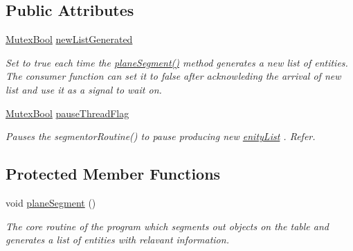 \subsection*{Public Attributes}
\begin{DoxyCompactItemize}
\item 
\hypertarget{classpersonal_robotics_1_1_object_segmentor_a11ae4522730ff37ab707dbacaf9c09fa}{}\hyperlink{classpersonal_robotics_1_1_mutex_type}{Mutex\+Bool} \hyperlink{classpersonal_robotics_1_1_object_segmentor_a11ae4522730ff37ab707dbacaf9c09fa}{new\+List\+Generated}\label{classpersonal_robotics_1_1_object_segmentor_a11ae4522730ff37ab707dbacaf9c09fa}

\begin{DoxyCompactList}\small\item\em Set to true each time the \hyperlink{classpersonal_robotics_1_1_object_segmentor_ad2e4795303539fb1cdd9408730e446cc}{plane\+Segment()} method generates a new list of entities. The consumer function can set it to false after acknowleding the arrival of new list and use it as a signal to wait on. \end{DoxyCompactList}\item 
\hyperlink{classpersonal_robotics_1_1_mutex_type}{Mutex\+Bool} \hyperlink{classpersonal_robotics_1_1_object_segmentor_a28d4c34eee7a10dc1d2bdd9ac5e2835e}{pause\+Thread\+Flag}
\begin{DoxyCompactList}\small\item\em Pauses the segmentor\+Routine() to pause producing new \hyperlink{}{enity\+List} . Refer. \end{DoxyCompactList}\end{DoxyCompactItemize}
\subsection*{Protected Member Functions}
\begin{DoxyCompactItemize}
\item 
void \hyperlink{classpersonal_robotics_1_1_object_segmentor_ad2e4795303539fb1cdd9408730e446cc}{plane\+Segment} ()
\begin{DoxyCompactList}\small\item\em The core routine of the program which segments out objects on the table and generates a list of entities with relavant information. \end{DoxyCompactList}\end{DoxyCompactItemize}
